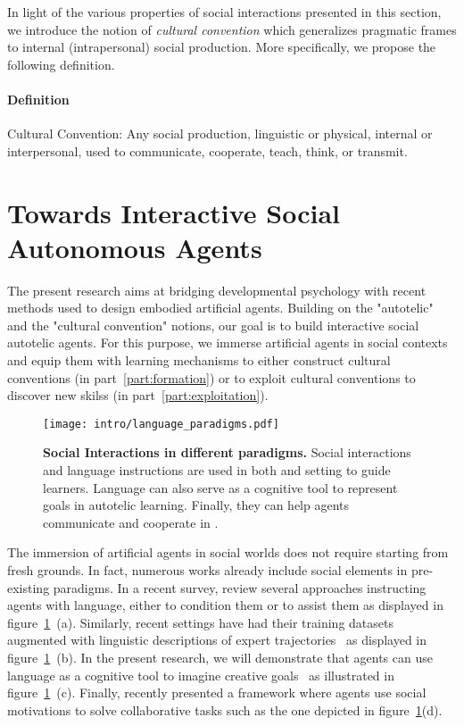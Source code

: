 In light of the various properties of social interactions presented in this section, we introduce the notion of \textit{cultural convention} which generalizes pragmatic frames to internal (intrapersonal) social production. More specifically, we propose the following definition.

\begin{tcolorbox}
\small
\paragraph{Definition}
\gls{Cultural Convention}: Any social production, linguistic or physical, internal or interpersonal, used to communicate, cooperate, teach, think, or transmit.
\end{tcolorbox}

\newpage

\section{Towards Interactive Social Autonomous Agents}

The present research aims at bridging developmental psychology with recent \ai methods used to design embodied artificial agents. Building on the "autotelic" and the "cultural convention" notions, our goal is to build interactive social autotelic agents. For this purpose, we immerse artificial agents in social contexts and equip them with learning mechanisms to either construct cultural conventions (in part~\ref{part:formation}) or to exploit cultural conventions to discover new skilss (in part~\ref{part:exploitation}). 

\begin{figure}[!h]
\centering
\texttt{[image: intro/language\_paradigms.pdf]}
\caption{\textbf{Social Interactions in different \ai paradigms.} Social interactions and language instructions are used in both \rl and \il setting to guide learners. Language can also serve as a cognitive tool to represent goals in autotelic learning. Finally, they can help agents communicate and cooperate in \marl.}
\label{fig:intro_language_paradigms}
\end{figure}

The immersion of artificial agents in social worlds does not require starting from fresh grounds. In fact, numerous works already include social elements in pre-existing \ai paradigms. In a recent survey, \citet{Luketina2019} review several approaches instructing \rl agents with language, either to condition them or to assist them as displayed in figure~\ref{fig:intro_language_paradigms}~(a). Similarly, recent \il settings have had their training datasets augmented with linguistic descriptions of expert trajectories~\citep{ALFRED20,pashevich2021episodic} as displayed in figure~\ref{fig:intro_language_paradigms}~(b). In the present research, we will demonstrate that agents can use language as a cognitive tool to imagine creative goals~\citep{colas2022language} as illustrated in figure~\ref{fig:intro_language_paradigms}~(c). Finally, \citet{jaques2019social} recently presented a \marl framework where agents use social motivations to solve collaborative tasks such as the one depicted in figure~\ref{fig:intro_language_paradigms}(d). 

